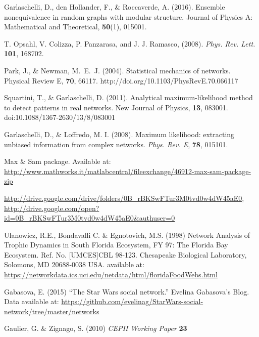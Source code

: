 \documentclass[aps,twocolumn,superscriptaddress]{revtex4-1}
\begin{document}
\begin{thebibliography}{99}
Garlaschelli, D., den Hollander, F., \& Roccaverde, A. (2016). Ensemble nonequivalence in random graphs with modular structure. Journal of Physics A: Mathematical and Theoretical, {\bf 50}(1), 015001.

T. Opsahl, V. Colizza, P. Panzarasa, and J. J. Ramasco, (2008). \emph{Phys. Rev. Lett.} {\bf 101}, 168702.



 Park, J., \& Newman, M.~E.~J. (2004). Statistical mechanics of networks. Physical Review E, {\bf 70}, 66117. http://doi.org/10.1103/PhysRevE.70.066117



 Squartini, T., \& Garlaschelli, D. (2011). Analytical maximum-likelihood method to detect patterns in real networks. New Journal of Physics, {\bf 13}, 083001. doi:10.1088/1367-2630/13/8/083001

Garlaschelli, D., \& Loffredo, M. I. (2008). Maximum likelihood: extracting unbiased information from complex networks. {\em Phys. Rev. E}, {\bf 78}, 015101.




Max \& Sam package. Available at: \url{http://www.mathworks.it/matlabcentral/fileexchange/46912-max-sam-package-zip}

\url{http://drive.google.com/drive/folders/0B_rBKSwFTur3M0tvd0w4dW45aE0}, 
\url{http://drive.google.com/open?id=0B_rBKSwFTur3M0tvd0w4dW45aE0\&authuser=0}




 Ulanowicz, R.E., Bondavalli C. \& Egnotovich, M.S. (1998) Network Analysis of Trophic Dynamics in South Florida Ecosystem, FY 97: The Florida Bay Ecosystem. Ref. No. [UMCES]CBL 98-123. Chesapeake Biological Laboratory, Solomons, MD 20688-0038 USA. available at: \url{https://networkdata.ics.uci.edu/netdata/html/floridaFoodWebs.html}

 Gabasova, E. (2015) ``The Star Wars social network.'' Evelina Gabasova's Blog. Data available at: \url{https://github.com/evelinag/StarWars-social-network/tree/master/networks}



 Gaulier, G. \& Zignago, S. (2010) {\it CEPII Working Paper} {\bf 23}
     

\end{thebibliography}
\end{document}
